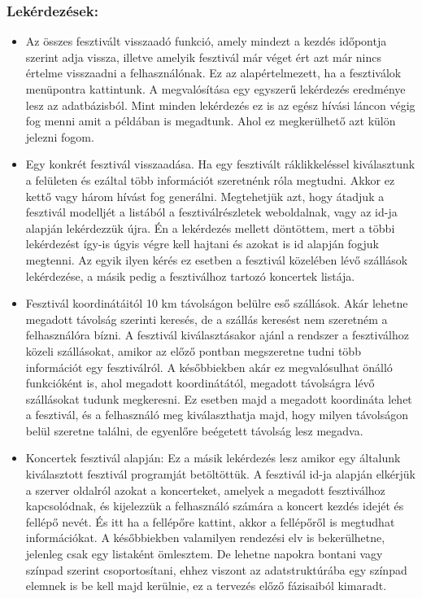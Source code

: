 \subsubsection{Lekérdezések:}
\begin{itemize}
\item Az összes fesztivált visszaadó funkció, amely mindezt a kezdés időpontja szerint adja vissza, illetve amelyik fesztivál már véget ért azt már nincs értelme visszaadni a felhasználónak. Ez az alapértelmezett, ha a fesztiválok menüpontra kattintunk. A megvalósítása egy egyszerű lekérdezés eredménye lesz az adatbázisból. Mint minden lekérdezés ez is az egész hívási láncon végig fog menni amit a példában is megadtunk. Ahol ez megkerülhető azt külön jelezni fogom.
 
\item Egy konkrét fesztivál visszaadása. Ha egy fesztivált ráklikkeléssel kiválasztunk a felületen és ezáltal több információt szeretnénk róla megtudni. Akkor ez kettő vagy három hívást fog generálni. Megtehetjük azt, hogy átadjuk a fesztivál modelljét a listából a fesztiválrészletek weboldalnak, vagy az id-ja alapján lekérdezzük újra. Én a lekérdezés mellett döntöttem, mert a többi lekérdezést így-is úgyis végre kell hajtani és azokat is id alapján fogjuk megtenni. Az egyik ilyen kérés ez esetben a fesztivál közelében lévő szállások lekérdezése, a másik pedig a fesztiválhoz tartozó koncertek listája.   

\item Fesztivál koordinátáitól 10 km távolságon belülre eső szállások. Akár lehetne megadott távolság szerinti keresés, de a szállás keresést nem szeretném a felhasználóra bízni. A fesztivál kiválasztásakor ajánl a rendszer a fesztiválhoz közeli szállásokat, amikor az előző pontban megszeretne tudni több információt egy fesztiválról. A későbbiekben akár ez megvalósulhat önálló funkcióként is, ahol megadott koordinátától, megadott távolságra lévő szállásokat tudunk megkeresni. Ez esetben majd a megadott koordináta lehet a fesztivál, és a felhasználó meg kiválaszthatja majd, hogy milyen távolságon belül szeretne találni, de egyenlőre beégetett távolság lesz megadva.

\item Koncertek fesztivál alapján: Ez a másik lekérdezés lesz amikor egy általunk kiválasztott fesztivál programját betöltöttük. A fesztivál id-ja alapján elkérjük a szerver oldalról azokat a koncerteket, amelyek a megadott fesztiválhoz kapcsolódnak, és kijelezzük a felhasználó számára a koncert kezdés idejét és fellépő nevét. És itt ha a fellépőre kattint, akkor a fellépőről is megtudhat információkat. A későbbiekben valamilyen rendezési elv is bekerülhetne, jelenleg csak egy listaként ömlesztem. De lehetne napokra bontani vagy színpad szerint csoportosítani, ehhez viszont az adatstruktúrába egy színpad elemnek is be kell majd kerülnie, ez a tervezés előző fázisaiból kimaradt.


\end{itemize}
